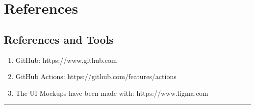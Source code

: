 \documentclass{Configuration_Files/Template}
\begin{document}
\chapter{References}

\section{References and Tools}

\begin{enumerate}
    \item GitHub: https://www.github.com
    \item GitHub Actions: https://github.com/features/actions
    \item The UI Mockups have been made with: https://www.figma.com
\end{enumerate}

{\color{bluepoli}\rule{\linewidth}{0.1pt}}
\end{document}

